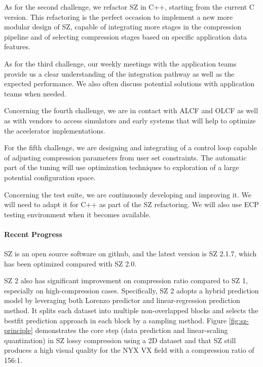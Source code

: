 As for the second challenge, we refactor SZ in C++, starting from the current C version. This refactoring is the perfect occasion to implement a new more modular design of SZ, capable of integrating more stages in the compression pipeline and of selecting compression stages based on specific application data features.

As for the third challenge, our weekly meetings with the application teams provide us a clear understanding of the integration pathway as well as the expected performance. We also often discuss potential solutions with application teams when needed. 

Concerning the fourth challenge, we are in contact with ALCF and OLCF as well as with vendors to access simulators and early systems that will help to optimize the aceelerator implementations.

For the fifth challenge, we are designing and integrating of a control loop capable of adjusting compression parameters from user set constraints. The automatic part of the tuning will use optimization techniques to exploration of a large potential configuration space.

Concerning the test suite, we are continuously developing and improving it. We will need to adapt it for C++ as part of the SZ refactoring. We will also use ECP testing environment when it becomes available.

\paragraph{Recent Progress}

SZ is an open source software on github, and the latest version is SZ 2.1.7, which has been optimized compared with SZ 2.0. 

SZ 2 also has significant improvement on compression ratio compared to SZ 1, especially on high-compression cases. Specifically, SZ 2 adopts a hybrid prediction model by leveraging both Lorenzo predictor and linear-regression prediction method. It splits each dataset into multiple non-overlapped blocks and selects the bestfit prediction approach in each block by a sampling method. Figure \ref{fig:sz-principle} demonstrates the core step (data prediction and linear-scaling quantization) in SZ lossy compression using a 2D dataset and that SZ still produces a high visual quality for the NYX VX field with a compression ratio of 156:1.

